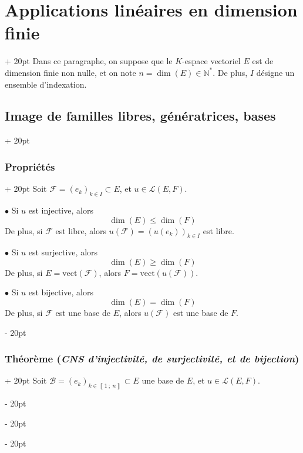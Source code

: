 \documentclass[a4paper, 12pt, twoside]{article}
\newcommand{\N}{\mathbb{N}} %
\newcommand{\nset}[2]{\left\llbracket #1\ ;\ #2 \right\rrbracket}
\renewcommand{\le}{\leqslant}
\renewcommand{\ge}{\geqslant}
\newcommand{\ind}[1][20pt]{\advance\leftskip + #1}
\newcommand{\deind}[1][20pt]{\advance\leftskip - #1}
\newenvironment{indt}[2][20pt]{#2 \par \ind[#1]}{\par \deind} %
\begin{document}
    \begin{indt}{\section{Applications linéaires en dimension finie}}
        Dans ce paragraphe, on suppose que le $K$-espace vectoriel $E$ est de dimension finie non nulle, et on note $n = \dim(E) \in \N^*$. De plus, $I$ désigne un ensemble d'indexation.

        \begin{indt}{\subsection{Image de familles libres, génératrices, bases}}
            \begin{indt}{\subsubsection{Propriétés}}
                Soit $\mathcal F = (e_k)_{k \in I} \subset E$, et $u \in \mathcal L(E, F)$.

                \vspace{6pt}
                
                $\bullet$ Si $u$ est injective, alors
                \[
                    \dim(E) \le \dim(F)
                \]
                De plus, si $\mathcal F$ est libre, alors $u(\mathcal F) = (u(e_k))_{k \in I}$ est libre.

                \vspace{12pt}
                
                $\bullet$ Si $u$ est surjective, alors
                \[
                    \dim(E) \ge \dim(F)
                \]
                De plus, si $E = \mathrm{vect}(\mathcal F)$, alors $F = \mathrm{vect}(u(\mathcal F))$.

                \vspace{12pt}
                
                $\bullet$ Si $u$ est bijective, alors
                \[
                    \dim(E) = \dim(F)
                \]
                De plus, si $\mathcal F$ est une base de $E$, alors $u(\mathcal F)$ est une base de $F$.
            \end{indt}

            \vspace{12pt}
            
            \begin{indt}{\subsubsection{Théorème (\textit{CNS d'injectivité, de surjectivité, et de bijection})}}
                Soit $\mathcal B = (e_k)_{k \in \nset 1 n} \subset E$ une base de $E$, et $u \in \mathcal L(E, F)$.


\end{indt}
\end{indt}
\end{indt}
\end{document}
